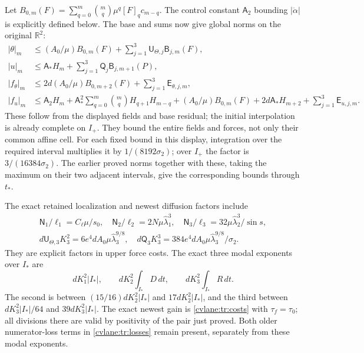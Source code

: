 Let $B_{0,m}(F)=\sum_{q=0}^m\binom mq\mu^q[F]_qc_{m-q}$.
The control constant $\mathsf A_2$ bounding $|\ddot\alpha|$
is explicitly defined below. The base and sums now give global norms
on the original $\mathbb R^2$:
\begin{align}\label{cvlane:trls:globalnorms}
 |\theta|_m&\leq(A_0/\mu)B_{0,m}(F)
       +\sum_{j=1}^3\mathsf U_{\Theta,j}\mathsf B_{j,m}(F),
 \nonumber\\
 |u|_m&\leq\mathsf A_*H_m
       +\sum_{j=1}^3\mathsf Q_j\mathsf B_{j,m+1}(P),\nonumber\\
 |f_\theta|_m&\leq2d(A_0/\mu)B_{0,m+2}(F)
                       +\sum_{j=1}^3\mathsf E_{\theta,j,m},\\
 |f_u|_m&\leq\mathsf A_2H_m
       +\mathsf A_*^2\sum_{q=0}^m\binom mqH_{q+1}H_{m-q}
       +(A_0/\mu)B_{0,m}(F)+2d\mathsf A_*H_{m+2}
                       +\sum_{j=1}^3\mathsf E_{u,j,m}.\nonumber
\end{align}
These follow from the displayed fields and base residual; the
initial interpolation is already complete on $I_+$. They bound
the entire fields and forces, not only their common affine cell.
For each fixed bound in this display, integration over the required
interval multiplies it by $1/(8192\sigma_2)$; over $I_+$ the
factor is $3/(16384\sigma_2)$. The earlier proved norms together
with these, taking the maximum on their two adjacent intervals,
give the corresponding bounds through $t_*$.

The exact retained localization and newest diffusion factors include
\begin{equation}\label{cvlane:trls:frequencycost}
 \begin{gathered}
 \mathsf N_1/\ell_1=C_\ell\mu/s_0,\quad
 \mathsf N_2/\ell_2=2N\mu\widehat\lambda_1^3,\quad
 \mathsf N_3/\ell_3=
                32\mu\widehat\lambda_2^3/\sin s,\\
 d\mathsf U_{\Theta,3}K_3^2
       =6e^4dA_0\mu\widehat\lambda_3^{9/8},\quad
 d\mathsf Q_3K_3^3
       =384e^4dA_0\mu\widehat\lambda_3^{9/8}/\sigma_2.
 \end{gathered}
\end{equation}
They are explicit factors in upper force costs. The exact three
modal exponents over $I_*$ are
\begin{equation}\label{cvlane:trls:exponents}
 dK_1^2|I_*|,\qquad dK_2^2\int_{I_*}D\,dt,\qquad
 dK_3^2\int_{I_*}R\,dt.
\end{equation}
The second is between $(15/16)dK_2^2|I_*|$ and
$17dK_2^2|I_*|$, and the third between
$dK_3^2|I_*|/64$ and $39dK_3^2|I_*|$.
The exact newest gain is \eqref{cvlane:tr:costs} with
$\tau_f=\tau_0$; all divisions there are valid by positivity
of the pair just proved. Both older numerator-loss terms in
\eqref{cvlane:tr:losses} remain present, separately from these modal
exponents.

